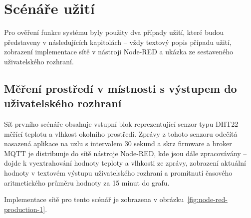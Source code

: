 \section{Scénáře užití}\label{sec:scenare-uziti}

Pro ověření funkce systému byly použity dva případy užití, které budou představeny v následujících kapitolách -- vždy
textový popis případu užití, zobrazení implementace sítě v nástroji Node-RED a ukázka ze sestaveného uživatelského
rozhraní.

\subsection{Měření prostředí v místnosti s výstupem do uživatelského rozhraní}\label{subsec:scenar-1}

Síť prvního scénáře obsahuje vstupní blok reprezentující senzor typu DHT22 měřící teplotu a vlhkost okolního prostředí.
Zprávy z tohoto senzoru odečítá nasazená aplikace na uzlu s intervalem 30 sekund a skrz firmware a broker MQTT je
distribuuje do sítě nástroje Node-RED, kde jsou dále zpracovávány -- dojde
k vyextrahování hodnoty teploty a vlhkosti ze zprávy, zobrazení aktuální hodnoty v textovém výstupu uživatelského
rozhraní a promítnutí časového aritmetického průměru hodnoty za 15 minut do grafu.

Implementace sítě pro tento scénář je zobrazena v obrázku~\ref{fig:node-red-production-1}.

